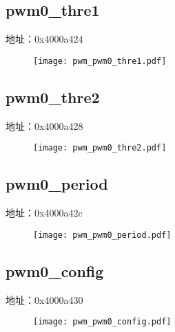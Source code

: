 \subsection{pwm0\_thre1}
\label{pwm-pwm0-thre1}
地址：0x4000a424
 \begin{figure}[H]
\texttt{[image: pwm\_pwm0\_thre1.pdf]}
\end{figure}

\subsection{pwm0\_thre2}
\label{pwm-pwm0-thre2}
地址：0x4000a428
 \begin{figure}[H]
\texttt{[image: pwm\_pwm0\_thre2.pdf]}
\end{figure}

\subsection{pwm0\_period}
\label{pwm-pwm0-period}
地址：0x4000a42c
 \begin{figure}[H]
\texttt{[image: pwm\_pwm0\_period.pdf]}
\end{figure}

\subsection{pwm0\_config}
\label{pwm-pwm0-config}
地址：0x4000a430
 \begin{figure}[H]
\texttt{[image: pwm\_pwm0\_config.pdf]}
\end{figure}

